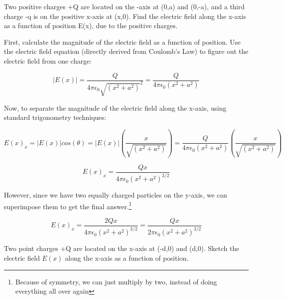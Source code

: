 
\begin{question}
Two positive charges +Q are located on the -axis at (0,a) and (0,-a), and a third charge -q is on the positive x-axis at (x,0). Find the electric field along the x-axis as a function of position E(x), due to the positive charges.
\end{question}

\begin{solution}
First, calculate the magnitude of the electric field as a function of position. Use the electric field equation (directly derived from Coulomb's Law) to figure out the electric field from one charge:

\begin{equation*}
    |E(x)| = \frac{Q}{4\pi\epsilon_0\sqrt{(x^2+a^2)}^2} =
             \frac{Q}{4\pi\epsilon_0(x^2+a^2)}
\end{equation*}

Now, to separate the magnitude of the electric field along the x-axis, using standard trigonometry techniques:

\begin{equation*}
    E(x)_x = |E(x)|cos(\theta) = |E(x)|(\frac{x}{\sqrt{(x^2+a^2)}})
    =
    \frac{Q}{4\pi\epsilon_0(x^2+a^2)}(\frac{x}{\sqrt{(x^2+a^2)}})
\end{equation*}

\begin{equation*}
    E(x)_x =
    \frac{Qx}{4\pi\epsilon_0(x^2+a^2)^{3/2}}
\end{equation*}

However, since we have two equally charged particles on the y-axis, we can superimpose them to get the final answer.\footnote{Because of symmetry, we can just multiply by two, instead of doing everything all over again}

\begin{equation*}
    E(x)_x =
    \frac{2Qx}{4\pi\epsilon_0(x^2+a^2)^{3/2}} =
    \frac{Qx}{2\pi\epsilon_0(x^2+a^2)^{3/2}}
\end{equation*}

\end{solution}


\begin{question}
Two point charges +Q are located on the x-axis at (-d,0) and (d,0). Sketch the electric field $E(x)$ along the x-axis as a function of position.
\end{question}

